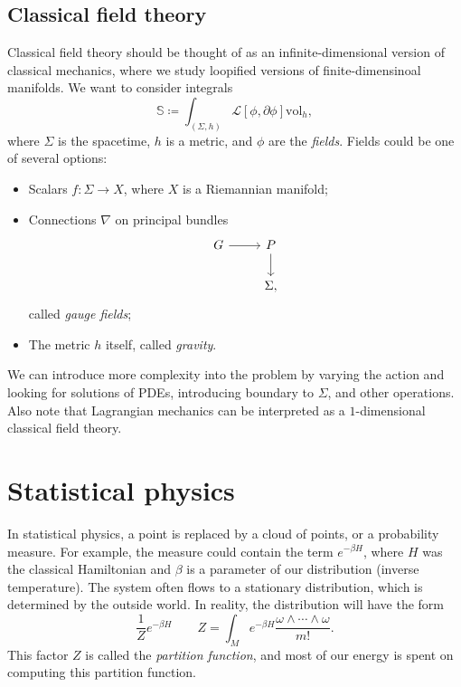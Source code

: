 \documentclass[leqno, openany]{memoir}
\theoremstyle{definition}
\theoremstyle{remark}
\theoremstyle{plain}
\theoremstyle{definition}
\theoremstyle{remark}
\newcommand{\mc}[1]{\mathcal{#1}}
\newcommand{\mr}[1]{\mathrm{#1}}
\begin{document}
\subsection{Classical field theory}
\label{subsec:classicalft}

Classical field theory should be thought of as an infinite-dimensional version of classical mechanics, where we study loopified versions of finite-dimensinoal manifolds. We want to consider integrals
\[ \mathbb{S} \coloneqq \int_{(\Sigma, h)} \mc{L}[\phi, \partial \phi] \mr{vol}_h, \]
where $\Sigma$ is the spacetime, $h$ is a metric, and $\phi$ are the \textit{fields}. Fields could be one of several options:
\begin{itemize}
\item Scalars $f \colon \Sigma \to X$, where $X$ is a Riemannian manifold;
\item Connections $\nabla$ on principal bundles
  \begin{equation*}
    \begin{tikzcd}
      G \ar{r} & P \ar{d} \\
      & \Sigma,
    \end{tikzcd}
  \end{equation*}
  called \textit{gauge fields};
  \item The metric $h$ itself, called \textit{gravity}.
\end{itemize}

We can introduce more complexity into the problem by varying the action and looking for solutions of PDEs, introducing boundary to $\Sigma$, and other operations. Also note that Lagrangian mechanics can be interpreted as a $1$-dimensional classical field theory.

\section{Statistical physics}
\label{sec:stat}

In statistical physics, a point is replaced by a cloud of points, or a probability measure. For example, the measure could contain the term $e^{-\beta H}$, where $H$ was the classical Hamiltonian and $\beta$ is a parameter of our distribution (inverse temperature). The system often flows to a stationary distribution, which is determined by the outside world. In reality, the distribution will have the form
\[ \frac{1}{Z} e^{-\beta H} \qquad Z = \int_M e^{-\beta H} \frac{\omega \wedge \cdots \wedge \omega}{m!}. \]
This factor $Z$ is called the \textit{partition function}, and most of our energy is spent on computing this partition function.
\end{document}

